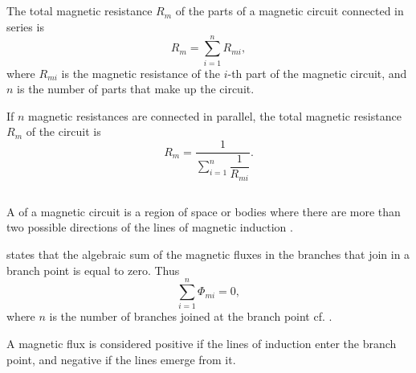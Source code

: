 \subsection{}\label{23.5.9} The total magnetic resistance $R_{m}$ of the parts of a magnetic circuit connected in series is
\begin{equation*}%
R_{m} = \sum_{i =1}^{n} R_{mi},
\end{equation*}
where $R_{mi}$ is the magnetic resistance of the $i$-th part of the magnetic circuit, and $n$ is the number of parts that make up the circuit.

If $n$ magnetic resistances are connected in parallel, the total magnetic resistance $R_{m}$ of the circuit is
\begin{equation*}%
R_{m} = \frac{1}{\displaystyle\sum_{i =1}^{n} \dfrac{1}{R_{mi}}}.
\end{equation*}

\subsection{}\label{23.5.10} A  of a magnetic circuit is a region of space or bodies where there are more than two possible directions of the lines of magnetic induction .

 states that the algebraic sum of the magnetic fluxes in the branches that join in a branch point is equal to zero. Thus
\begin{equation*}%
\sum_{i =1}^{n} \Phi_{mi} = 0,
\end{equation*}
where $n$ is the number of branches joined at the branch point cf. .

A magnetic flux is considered positive if the lines of induction enter the branch point, and negative if the lines emerge from it. 


